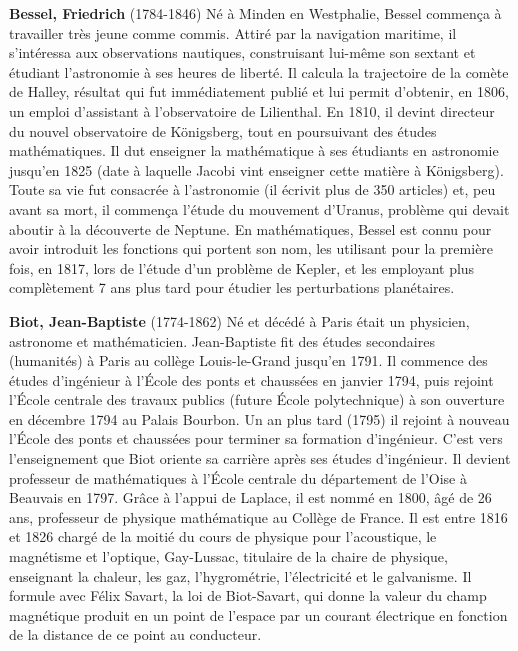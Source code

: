 \textbf{Bessel, Friedrich} (1784-1846) Né à Minden en Westphalie, Bessel commença à travailler très jeune comme commis. Attiré par la navigation maritime, il s'intéressa aux observations nautiques, construisant lui-même son sextant et étudiant l'astronomie à ses heures de liberté. Il calcula la trajectoire de la comète de Halley, résultat qui fut immédiatement publié et lui permit d'obtenir, en 1806, un emploi d'assistant à l'observatoire de Lilienthal. En 1810, il devint directeur du nouvel observatoire de Königsberg, tout en poursuivant des études mathématiques. Il dut enseigner la mathématique à ses étudiants en astronomie jusqu'en 1825 (date à laquelle Jacobi vint enseigner cette matière à Königsberg). Toute sa vie fut consacrée à l'astronomie (il écrivit plus de 350 articles) et, peu avant sa mort, il commença l'étude du mouvement d'Uranus, problème qui devait aboutir à la découverte de Neptune. En mathématiques, Bessel est connu pour avoir introduit les fonctions qui portent son nom, les utilisant pour la première fois, en 1817, lors de l'étude d'un problème de Kepler, et les employant plus complètement 7 ans plus tard pour étudier les perturbations planétaires.

\textbf{Biot, Jean-Baptiste} (1774-1862) Né et décédé à Paris était un physicien, astronome et mathématicien. Jean-Baptiste fit des études secondaires (humanités) à Paris au collège Louis-le-Grand jusqu'en 1791. Il commence des études d'ingénieur à l'École des ponts et chaussées en janvier 1794, puis rejoint l'École centrale des travaux publics (future École polytechnique) à son ouverture en décembre 1794 au Palais Bourbon. Un an plus tard (1795) il rejoint à nouveau l'École des ponts et chaussées pour terminer sa formation d'ingénieur. C'est vers l'enseignement que Biot oriente sa carrière après ses études d'ingénieur. Il devient professeur de mathématiques à l'École centrale du département de l'Oise à Beauvais en 1797. Grâce à l'appui de Laplace, il est nommé en 1800, âgé de 26 ans, professeur de physique mathématique au Collège de France. Il est entre 1816 et 1826 chargé de la moitié du cours de physique pour l'acoustique, le magnétisme et l'optique, Gay-Lussac, titulaire de la chaire de physique, enseignant la chaleur, les gaz, l'hygrométrie, l'électricité et le galvanisme. Il formule avec Félix Savart, la loi de Biot-Savart, qui donne la valeur du champ magnétique produit en un point de l'espace par un courant électrique en fonction de la distance de ce point au conducteur.

